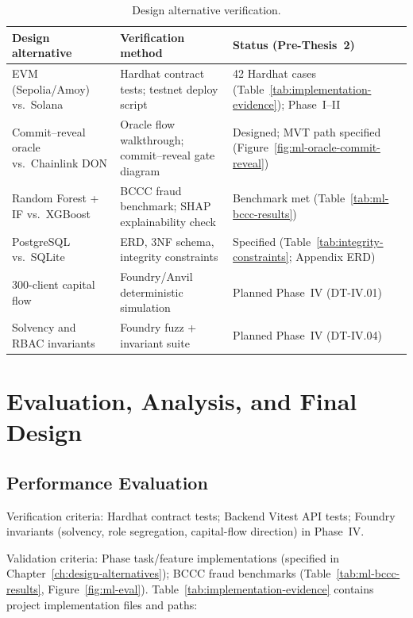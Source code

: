 \documentclass[12pt,a4paper]{report}
\newcommand{\tableheadcolor}{\rowcolor{TableHeadBg}}
\begin{document}
\begin{table}[H]
\centering
\caption[Design alternative verification]{Design alternative verification.}
\label{tab:design-alternative-verification}
\small
\begin{tabular}{@{}p{3.4cm}p{4.2cm}p{6.0cm}@{}}
\toprule
\tableheadcolor
\textbf{Design alternative} & \textbf{Verification method} & \textbf{Status (Pre-Thesis~2)} \\
\midrule
EVM (Sepolia/Amoy) vs.\ Solana & Hardhat contract tests; testnet deploy script & 42 Hardhat cases (Table~\ref{tab:implementation-evidence}); Phase~I--II \\
Commit--reveal oracle vs.\ Chainlink DON & Oracle flow walkthrough; commit--reveal gate diagram & Designed; MVT path specified (Figure~\ref{fig:ml-oracle-commit-reveal}) \\
Random Forest + IF vs.\ XGBoost & BCCC fraud benchmark; SHAP explainability check & Benchmark met (Table~\ref{tab:ml-bccc-results}) \\
PostgreSQL vs.\ SQLite & ERD, 3NF schema, integrity constraints & Specified (Table~\ref{tab:integrity-constraints}; Appendix ERD) \\
300-client capital flow & Foundry/Anvil deterministic simulation & Planned Phase~IV (DT-IV.01) \\
Solvency and RBAC invariants & Foundry fuzz + invariant suite & Planned Phase~IV (DT-IV.04) \\
\bottomrule
\end{tabular}
\end{table}




\chapter{Evaluation, Analysis, and Final Design}
\label{ch:evaluation}
\label{ch:market-analysis}

\section{Performance Evaluation}
\label{sec:performance-evaluation}
\label{sec:eval-method}
\label{sec:verification-validation}
\label{sec:foundry}

Verification criteria: Hardhat contract tests; Backend Vitest API tests; Foundry invariants (solvency, role segregation, capital-flow direction) in Phase~IV.

Validation criteria: Phase task/feature implementations (specified in Chapter~\ref{ch:design-alternatives}); BCCC fraud benchmarks (Table~\ref{tab:ml-bccc-results}, Figure~\ref{fig:ml-eval}). Table~\ref{tab:implementation-evidence} contains project implementation files and paths:
\end{document}
